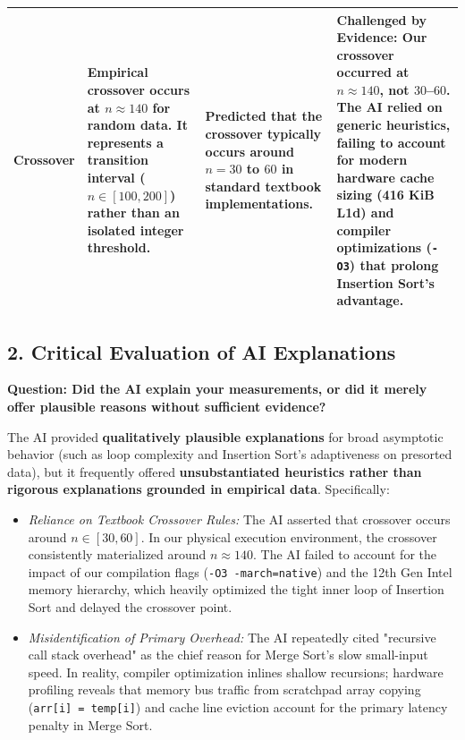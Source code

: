 \documentclass[11pt]{article}
\begin{document}
\begin{center}
\begin{tabularx}{\textwidth}{l >{\raggedright\arraybackslash}X >{\raggedright\arraybackslash}X >{\raggedright\arraybackslash}X}
\midrule
\textbf{Crossover} & Empirical crossover occurs at $n \approx 140$ for random data. It represents a transition interval ($n \in [100, 200]$) rather than an isolated integer threshold. & Predicted that the crossover typically occurs around $n = 30$ to $60$ in standard textbook implementations. & \textbf{Challenged by Evidence:} Our crossover occurred at $n \approx 140$, not $30$--$60$. The AI relied on generic heuristics, failing to account for modern hardware cache sizing (416 KiB L1d) and compiler optimizations (\texttt{-O3}) that prolong Insertion Sort's advantage. \\
\bottomrule
\end{tabularx}
\end{center}

\newpage

\subsection*{2. Critical Evaluation of AI Explanations}
\noindent\textbf{Question: Did the AI explain your measurements, or did it merely offer plausible reasons without sufficient evidence?}

\noindent The AI provided \textbf{qualitatively plausible explanations} for broad asymptotic behavior (such as loop complexity and Insertion Sort's adaptiveness on presorted data), but it frequently offered \textbf{unsubstantiated heuristics rather than rigorous explanations grounded in empirical data}. Specifically:
\begin{itemize}[itemsep=0.2em, topsep=0.2em]
    \item \textit{Reliance on Textbook Crossover Rules:} The AI asserted that crossover occurs around $n \in [30, 60]$. In our physical execution environment, the crossover consistently materialized around $n \approx 140$. The AI failed to account for the impact of our compilation flags (\texttt{-O3 -march=native}) and the 12th Gen Intel memory hierarchy, which heavily optimized the tight inner loop of Insertion Sort and delayed the crossover point.
    \item \textit{Misidentification of Primary Overhead:} The AI repeatedly cited "recursive call stack overhead" as the chief reason for Merge Sort's slow small-input speed. In reality, compiler optimization inlines shallow recursions; hardware profiling reveals that memory bus traffic from scratchpad array copying (\texttt{arr[i] = temp[i]}) and cache line eviction account for the primary latency penalty in Merge Sort.
\end{itemize}
\end{document}
